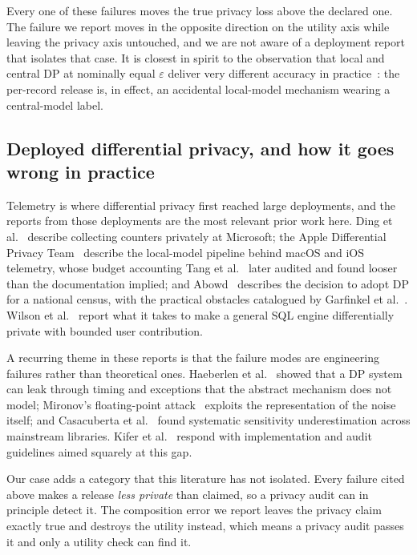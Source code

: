\documentclass[journal]{IEEEtran}
\theoremstyle{definition}
\begin{document}
Every one of these failures moves the true privacy loss above the declared one.
The failure we report moves in the opposite direction on the utility axis while
leaving the privacy axis untouched, and we are not aware of a deployment report
that isolates that case. It is closest in spirit to the observation that local
and central DP at nominally equal $\varepsilon$ deliver very different accuracy
in practice~\cite{cormode2018practice}: the per-record release is, in effect, an
accidental local-model mechanism wearing a central-model label.


\subsection{Deployed differential privacy, and how it goes wrong in practice}

Telemetry is where differential privacy first reached large deployments, and the
reports from those deployments are the most relevant prior work here.
Ding et al.~\cite{ding2017telemetry} describe collecting counters privately at
Microsoft; the Apple Differential Privacy Team~\cite{apple2017scale} describe the
local-model pipeline behind macOS and iOS telemetry, whose budget accounting
Tang et al.~\cite{tang2017apple} later audited and found looser than the
documentation implied; and Abowd~\cite{abowd2018census} describes the decision to
adopt DP for a national census, with the practical obstacles catalogued by
Garfinkel et al.~\cite{garfinkel2018issues}. Wilson et
al.~\cite{wilson2020dpsql} report what it takes to make a general SQL engine
differentially private with bounded user contribution.

A recurring theme in these reports is that the failure modes are engineering
failures rather than theoretical ones. Haeberlen et
al.~\cite{haeberlen2011underfire} showed that a DP system can leak through timing
and exceptions that the abstract mechanism does not model; Mironov's
floating-point attack~\cite{mironov2012lsb} exploits the representation of the
noise itself; and Casacuberta et al.~\cite{casacuberta2022sensitivity} found
systematic sensitivity underestimation across mainstream libraries. Kifer et
al.~\cite{kifer2020guidelines} respond with implementation and audit guidelines
aimed squarely at this gap.

Our case adds a category that this literature has not isolated. Every failure
cited above makes a release \emph{less private} than claimed, so a privacy audit
can in principle detect it. The composition error we report leaves the privacy
claim exactly true and destroys the utility instead, which means a privacy audit
passes it and only a utility check can find it.
\end{document}

